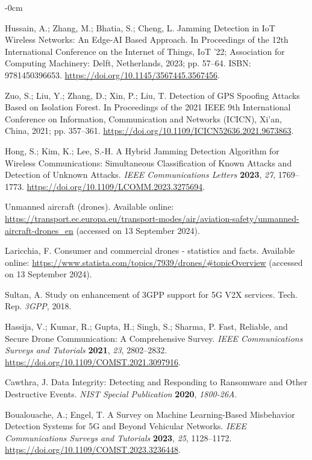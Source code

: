 \documentclass[futureinternet,article,submit,pdftex,moreauthors]{Definitions/mdpi}
\begin{document}
\begin{adjustwidth}{-\extralength}{0cm}
\begin{thebibliography}{999}
Hussain, A.; Zhang, M.; Bhatia, S.; Cheng, L. Jamming Detection in IoT Wireless Networks: An Edge-AI Based Approach. In Proceedings of the 12th International Conference on the Internet of Things, IoT ’22; Association for Computing Machinery: Delft, Netherlands, 2023; pp. 57--64. ISBN: 9781450396653. \url{https://doi.org/10.1145/3567445.3567456}.

Zuo, S.; Liu, Y.; Zhang, D.; Xin, P.; Liu, T. Detection of GPS Spoofing Attacks Based on Isolation Forest. In Proceedings of the 2021 IEEE 9th International Conference on Information, Communication and Networks (ICICN), Xi'an, China, 2021; pp. 357--361. \url{https://doi.org/10.1109/ICICN52636.2021.9673863}.

Hong, S.; Kim, K.; Lee, S.-H. A Hybrid Jamming Detection Algorithm for Wireless Communications: Simultaneous Classification of Known Attacks and Detection of Unknown Attacks. {\em IEEE Communications Letters} {\bf 2023}, {\em 27}, 1769--1773. \url{https://doi.org/10.1109/LCOMM.2023.3275694}.

Unmanned aircraft (drones). Available online: \url{https://transport.ec.europa.eu/transport-modes/air/aviation-safety/unmanned-aircraft-drones_en} (accessed on 13 September 2024).

Laricchia, F. Consumer and commercial drones - statistics and facts. Available online: \url{https://www.statista.com/topics/7939/drones/\#topicOverview} (accessed on 13 September 2024).

Sultan, A. Study on enhancement of 3GPP support for 5G V2X services. Tech. Rep. {\em 3GPP}, 2018.

Hassija, V.; Kumar, R.; Gupta, H.; Singh, S.; Sharma, P. Fast, Reliable, and Secure Drone Communication: A Comprehensive Survey. {\em IEEE Communications Surveys and Tutorials} {\bf 2021}, {\em 23}, 2802--2832. \url{https://doi.org/10.1109/COMST.2021.3097916}.

Cawthra, J. Data Integrity: Detecting and Responding to Ransomware and Other Destructive Events. {\em NIST Special Publication} {\bf 2020}, {\em 1800-26A}.

Boualouache, A.; Engel, T. A Survey on Machine Learning-Based Misbehavior Detection Systems for 5G and Beyond Vehicular Networks. {\em IEEE Communications Surveys and Tutorials} {\bf 2023}, {\em 25}, 1128--1172. \url{https://doi.org/10.1109/COMST.2023.3236448}.


\end{thebibliography}
\end{adjustwidth}
\end{document}
